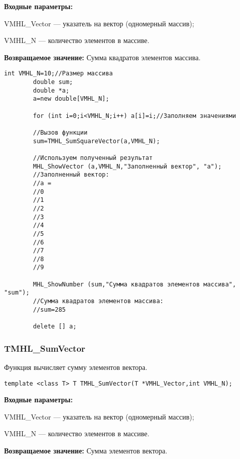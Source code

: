 \documentclass[a4paper,12pt]{article}
\begin{document}
\textbf{Входные параметры:}

 VMHL\_Vector --- указатель на вектор (одномерный массив);
 
 VMHL\_N --- количество элементов в массиве.

\textbf{Возвращаемое значение:}
Сумма квадратов элементов массива.


\begin{lstlisting}[label=code_use_TMHL_SumSquareVector,caption=Пример использования]
        int VMHL_N=10;//Размер массива
        double sum;
        double *a;
        a=new double[VMHL_N];

        for (int i=0;i<VMHL_N;i++) a[i]=i;//Заполняем значениями

        //Вызов функции
        sum=TMHL_SumSquareVector(a,VMHL_N);

        //Используем полученный результат
        MHL_ShowVector (a,VMHL_N,"Заполненный вектор", "a");
        //Заполненный вектор:
        //a =
        //0
        //1
        //2
        //3
        //4
        //5
        //6
        //7
        //8
        //9

        MHL_ShowNumber (sum,"Сумма квадратов элементов массива", "sum");
        //Сумма квадратов элементов массива:
        //sum=285

        delete [] a;
\end{lstlisting}

\subsubsection{TMHL\_SumVector}\label{TMHL_SumVector}

Функция вычисляет сумму элементов вектора.


\begin{lstlisting}[label=code_syntax_TMHL_SumVector,caption=Синтаксис]
template <class T> T TMHL_SumVector(T *VMHL_Vector,int VMHL_N);
\end{lstlisting}

\textbf{Входные параметры:}

 VMHL\_Vector --- указатель на вектор (одномерный массив);
 
 VMHL\_N --- количество элементов в массиве.

\textbf{Возвращаемое значение:}
Сумма элементов вектора.
\end{document}
